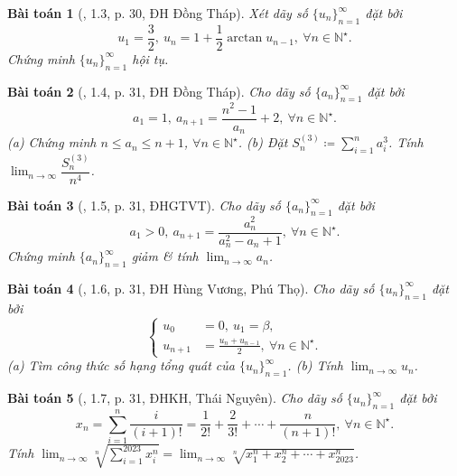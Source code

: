 \documentclass{article}
\newtheorem{baitoan}{Bài toán}
\begin{document}
\begin{baitoan}[\cite{VMS_VMC2023}, 1.3, p. 30, ĐH Đồng Tháp]
	Xét dãy số $\{u_n\}_{n=1}^\infty$ đặt bởi
	\begin{equation*}
		u_1 = \frac{3}{2},\ u_n = 1 + \frac{1}{2}\arctan u_{n-1},\ \forall n\in\mathbb{N}^\star.
	\end{equation*}
	Chứng minh $\{u_n\}_{n=1}^\infty$ hội tụ.
\end{baitoan}

\begin{baitoan}[\cite{VMS_VMC2023}, 1.4, p. 31, ĐH Đồng Tháp]
	Cho dãy số $\{a_n\}_{n=1}^\infty$ đặt bởi
	\begin{equation*}
		a_1 = 1,\ a_{n+1} = \frac{n^2 - 1}{a_n} + 2,\ \forall n\in\mathbb{N}^\star.
	\end{equation*}
	(a) Chứng minh $n\le a_n\le n + 1$, $\forall n\in\mathbb{N}^\star$. (b) Đặt $S_n^{(3)}\coloneqq\sum_{i=1}^n a_i^3$. Tính $\lim_{n\to\infty} \dfrac{S_n^{(3)}}{n^4}$.
\end{baitoan}

\begin{baitoan}[\cite{VMS_VMC2023}, 1.5, p. 31, ĐHGTVT]
	Cho dãy số $\{a_n\}_{n=1}^\infty$ đặt bởi
	\begin{equation*}
		a_1 > 0,\ a_{n+1} = \frac{a_n^2}{a_n^2 - a_n + 1},\ \forall n\in\mathbb{N}^\star.
	\end{equation*}
	Chứng minh $\{a_n\}_{n=1}^\infty$ giảm \& tính $\lim_{n\to\infty} a_n$.
\end{baitoan}

\begin{baitoan}[\cite{VMS_VMC2023}, 1.6, p. 31, ĐH Hùng Vương, Phú Thọ]
	Cho dãy số $\{u_n\}_{n=1}^\infty$ đặt bởi
	\begin{equation*}
		\left\{\begin{split}
			u_0 &= 0,\ u_1 = \beta,\\
			u_{n+1} &= \frac{u_n + u_{n-1}}{2},\ \forall n\in\mathbb{N}^\star.
		\end{split}\right.
	\end{equation*}
	(a) Tìm công thức số hạng tổng quát của $\{u_n\}_{n=1}^\infty$. (b) Tính $\lim_{n\to\infty} u_n$.
\end{baitoan}

\begin{baitoan}[\cite{VMS_VMC2023}, 1.7, p. 31, ĐHKH, Thái Nguyên]
	Cho dãy số $\{u_n\}_{n=1}^\infty$ đặt bởi
	\begin{equation*}
		x_n = \sum_{i=1}^n \frac{i}{(i + 1)!} = \frac{1}{2!} + \frac{2}{3!} + \cdots + \frac{n}{(n + 1)!},\ \forall n\in\mathbb{N}^\star.
	\end{equation*}
	Tính $\lim_{n\to\infty} \sqrt[n]{\sum_{i=1}^{2023} x_i^n} = \lim_{n\to\infty} \sqrt[n]{x_1^n + x_2^n + \cdots + x_{2023}^n}$.
\end{baitoan}
\end{document}
